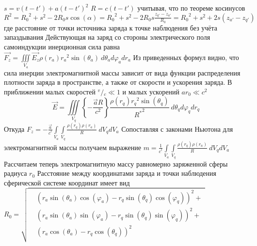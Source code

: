 ﻿\documentclass[12pt]{article}
\begin{document}
$s=v\left( t-t' \right)+a{{\left( t-t' \right)}^{2}}$ 
$R=c\left( t-t' \right)$ 
учитывая, что по теореме косинусов
${{R}^{2}}={{R}_{0}}^{2}+{{s}^{2}}-2{{R}_{0}}s\cos \left( \alpha  \right)={{R}_{0}}^{2}+{{s}^{2}}-2{{R}_{0}}s\frac{{{z}_{q'}}-{{z}_{a'}}}{{{R}_{0}}}={{R}_{0}}^{2}+{{s}^{2}}+2s\left( {{z}_{a'}}-{{z}_{q'}} \right)$ 
где  расстояние от точки источника заряда к точке наблюдения без учёта запаздывания
Действующая на заряд со стороны электрического поля самоиндукции инерционная сила равна
$\overrightarrow{{{F}_{z}}}=\iiint\limits_{{{V}_{a}}}{\overrightarrow{{{E}_{z}}}\rho \left( {{r}_{a}} \right){{r}_{a}}^{2}\sin \left( {{\theta }_{a}} \right)}\ d{{\theta }_{a}}d{{\varphi }_{a}}d{{r}_{a}}$ 
Из приведенных формул видно, что сила инерции электромагнитной массы зависит от вида функции распределения плотности заряда в пространстве, а также от скорости и ускорения заряда.
В приближении малых скоростей ${}^{v}/{}_{c}\ll 1$  и малых ускорений $a{{r}_{0}}\ll {{c}^{2}}$ 
\[\overrightarrow{E}=\iiint\limits_{{{V}_{q}}}{\left\{ -\frac{\overrightarrow{a}R}{{{c}^{2}}} \right\}\frac{\rho \left( {{r}_{q}} \right){{r}_{q}}^{2}\sin \left( {{\theta }_{q}} \right)}{{{R}^{*}}^{2}}\ }d{{\theta }_{q}}d{{\varphi }_{q}}d{{r}_{q}}\]
Откуда 
${{F}_{z}}=-\frac{\overrightarrow{a}}{{{c}^{^{2}}}}\int\limits_{{{V}_{a}}}{\int\limits_{{{V}_{q}}}{\frac{\rho \left( {{r}_{q}} \right)\rho \left( {{r}_{a}} \right)}{R}}}\ d{{V}_{q}}d{{V}_{a}}$ 
Сопоставляя с законами Ньютона для электромагнитной массы получаем выражение
$m=\frac{1}{{{c}^{^{2}}}}\int\limits_{{{V}_{a}}}{\int\limits_{{{V}_{q}}}{\frac{\rho \left( {{r}_{q}} \right)\rho \left( {{r}_{a}} \right)}{R}}}\ d{{V}_{q}}d{{V}_{a}}$
Рассчитаем теперь электромагнитную массу равномерно заряженной сферы радиуса ${{r}_{0}}$ 
Расстояние между координатами заряда и точки наблюдения сферической системе координат имеет вид
${{R}_{0}}=\sqrt{\begin{align}
  & {{\left( {{r}_{a}}\sin \left( {{\theta }_{a}} \right)\cos \left( {{\varphi }_{a}} \right)-{{r}_{q}}\sin \left( {{\theta }_{q}} \right)\cos \left( {{\varphi }_{q}} \right) \right)}^{2}}+ \\ 
 & {{\left( {{r}_{a}}\sin \left( {{\theta }_{a}} \right)\sin \left( {{\varphi }_{a}} \right)-{{r}_{q}}\sin \left( {{\theta }_{q}} \right)\sin \left( {{\varphi }_{q}} \right) \right)}^{2}}+ \\ 
 & {{\left( {{r}_{a}}\cos \left( {{\theta }_{a}} \right)-{{r}_{q}}\cos \left( {{\theta }_{q}} \right) \right)}^{2}} \\ 
\end{align}}$ 
\end{document}
